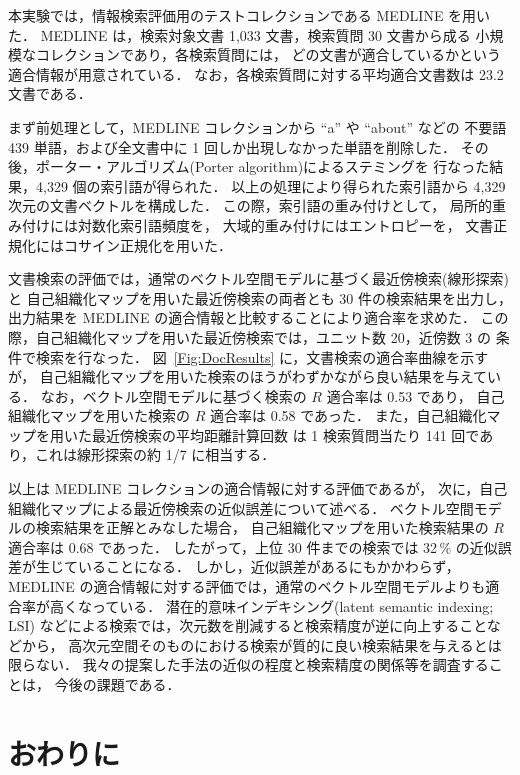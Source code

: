 本実験では，情報検索評価用のテストコレクションである MEDLINE を用いた．
MEDLINE は，検索対象文書 1,033 文書，検索質問 30 文書から成る
小規模なコレクションであり，各検索質問には，
どの文書が適合しているかという適合情報が用意されている．
なお，各検索質問に対する平均適合文書数は 23.2 文書である．

まず前処理として，MEDLINE コレクションから ``a'' や ``about'' などの
不要語 439 単語，および全文書中に 1 回しか出現しなかった単語を削除した．
その後，ポーター・アルゴリズム(Porter algorithm)\cite{Porter80}によるステミングを
行なった結果，4,329 個の索引語が得られた．
以上の処理により得られた索引語から 4,329 次元の文書ベクトルを構成した．
この際，索引語の重み付けとして，
局所的重み付けには対数化索引語頻度を，
大域的重み付けにはエントロピーを，
文書正規化にはコサイン正規化を用いた\cite{IRbook}．


文書検索の評価では，通常のベクトル空間モデルに基づく最近傍検索(線形探索)と
自己組織化マップを用いた最近傍検索の両者とも 30 件の検索結果を出力し，
出力結果を MEDLINE の適合情報と比較することにより適合率を求めた．
この際，自己組織化マップを用いた最近傍検索では，ユニット数 20，近傍数 3 の
条件で検索を行なった．
図~\ref{Fig:DocResults} に，文書検索の適合率曲線を示すが，
自己組織化マップを用いた検索のほうがわずかながら良い結果を与えている．
なお，ベクトル空間モデルに基づく検索の $R$ 適合率は 0.53 であり，
自己組織化マップを用いた検索の $R$ 適合率は 0.58 であった．
また，自己組織化マップを用いた最近傍検索の平均距離計算回数
は 1 検索質問当たり 141 回であり，これは線形探索の約 1/7 に相当する．

以上は MEDLINE コレクションの適合情報に対する評価であるが，
次に，自己組織化マップによる最近傍検索の近似誤差について述べる．
ベクトル空間モデルの検索結果を正解とみなした場合，
自己組織化マップを用いた検索結果の $R$ 適合率は 0.68 であった．
したがって，上位 30 件までの検索では 32\,\% の近似誤差が生じていることになる．
しかし，近似誤差があるにもかかわらず，
MEDLINE の適合情報に対する評価では，通常のベクトル空間モデルよりも適合率が高くなっている．
潜在的意味インデキシング(latent semantic indexing; LSI)\cite{Berry99}
などによる検索では，次元数を削減すると検索精度が逆に向上することなどから，
高次元空間そのものにおける検索が質的に良い検索結果を与えるとは限らない．
我々の提案した手法の近似の程度と検索精度の関係等を調査することは，
今後の課題である．

\section{おわりに}

